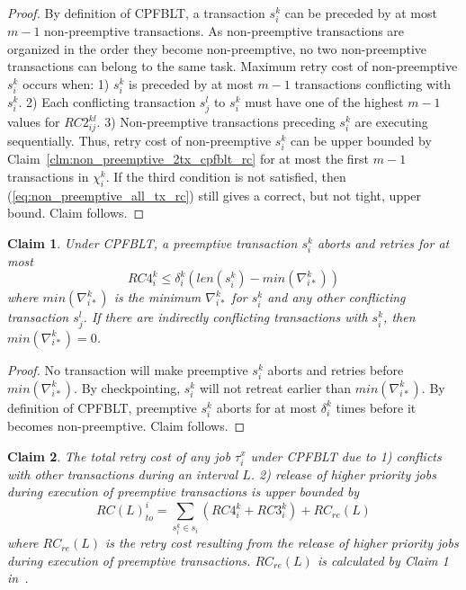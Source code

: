 \documentclass[conference]{IEEEtran}
\newtheorem{clm}{Claim}
\begin{document}
%
\begin{proof}
By definition of CPFBLT, a transaction $s_i^k$ can be preceded by at most $m-1$ non-preemptive transactions. As non-preemptive transactions are organized in the order they become non-preemptive, no two non-preemptive transactions can belong to the same task. Maximum retry cost of non-preemptive $s_i^k$ occurs when: 1) $s_i^k$ is preceded by at most $m-1$ transactions conflicting with $s_i^k$. 2) Each conflicting transaction $s_j^l$ to $s_i^k$ must have one of the highest $m-1$ values for $RC2_{ij}^{kl}$. 3) Non-preemptive transactions preceding $s_i^k$ are executing sequentially. Thus, retry cost of non-preemptive $s_i^k$ can be upper bounded by Claim~\ref{clm:non_preemptive_2tx_cpfblt_rc} for at most the first $m-1$ transactions in $\chi_i^k$. If the third condition is not satisfied, then (\ref{eq:non_preemptive_all_tx_rc}) still gives a correct, but not tight, upper bound. Claim follows.
\end{proof}
%
\begin{clm}\label{clm:delta_ik_rc}
%
Under CPFBLT, a preemptive transaction $s_i^k$ aborts and retries for at most
\begin{equation}
RC4_i^k \le \delta_i^k \left(len\left(s_i^k\right)-min\left(\nabla_{i*}^k\right)\right)
\label{eq:delta_ik_rc}
\end{equation}
%
where $min\left(\nabla_{i*}^k\right)$ is the minimum $\nabla_{i*}^k$ for $s_i^k$ and any other conflicting transaction $s_j^l$. If there are indirectly conflicting transactions with $s_i^k$, then $min\left(\nabla_{i*}^k\right)=0$.
%
\end{clm}
%
\begin{proof}
%
No transaction will make preemptive $s_i^k$ aborts and retries before $min\left(\nabla_{i*}^k\right)$. By checkpointing, $s_i^k$ will not retreat earlier than $min\left(\nabla_{i*}^k\right)$. By definition of CPFBLT, preemptive $s_i^k$ aborts for at most $\delta_i^k$ times before it becomes non-preemptive. Claim follows.
\end{proof}
%
\begin{clm}\label{clm:closed_nested_fblt_final}
%
The total retry cost of any job $\tau_i^x$ under CPFBLT due to 1) conflicts with other transactions during an interval $L$. 2) release of higher priority jobs during execution of preemptive transactions is upper bounded by
%
\begin{equation}
RC(L)_{to}^i=\sum_{s_i^k \in s_i} \left(RC4_i^k + RC3_i^k \right) + RC_{re}(L)
\label{eq:cpfblt_final}
\end{equation}
where $RC_{re}(L)$ is the retry cost resulting from the release of higher priority jobs during execution of preemptive transactions. $RC_{re}(L)$ is calculated by Claim 1 in~\cite{fblt}.
%
\end{clm}
\end{document}
